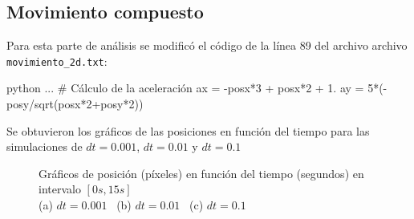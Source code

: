 \documentclass[12pt, a4paper]{article}
\begin{document}
\subsection{Movimiento compuesto}
Para esta parte de análisis se modificó el código de la línea 89 del archivo archivo \texttt{movimiento\_2d.txt}:

\begin{mintedbox}{python}
...
# Cálculo de la aceleración
    ax = -posx*3 + posx*2 + 1.
    ay = 5*(-posy/sqrt(posx*2+posy*2))
\end{mintedbox}

Se obtuvieron los gráficos de las posiciones en función del tiempo para las simulaciones de $dt=0.001$, $dt=0.01$ y $dt=0.1$

\begin{figure}[H]
    \centering
    \captionsetup{justification=centering}
    \hfill
    \caption{Gráficos de posición (píxeles) en función del tiempo (segundos) en intervalo $[0s, 15s]$\\ (a) $dt=0.001$ \, (b) $dt=0.01$ \, (c) $dt=0.1$}
    \label{fig:part2b}
\end{figure}
\end{document}
